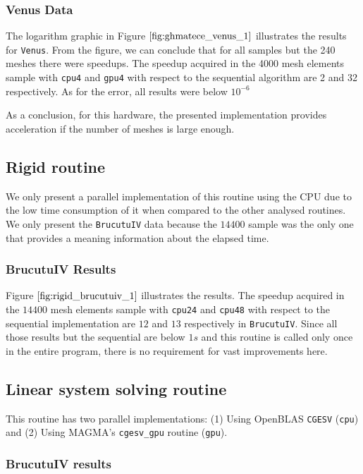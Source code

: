 \subsubsection{Venus Data}

The logarithm graphic in Figure $\ref{fig:ghmatece_venus_1}$ illustrates the results for \texttt{Venus}. 
From the figure, we can conclude that for all samples but the 240 meshes there were speedups. The speedup 
acquired in the 4000 mesh elements sample with \texttt{cpu4} and \texttt{gpu4} with respect to the sequential algorithm are 2 and 32 respectively.
As for the error, all results were below  $10^{-6}$

As a conclusion, for this hardware, the presented implementation provides acceleration if the number of meshes is large enough. 

\subsection{Rigid routine}

We only present a parallel implementation of this routine using the CPU due to the low time 
consumption of it when compared to the other analysed routines. We only present the \texttt{BrucutuIV} 
data because the $14400$ sample was the only one that provides a meaning information about the elapsed time.

\subsubsection{BrucutuIV Results}

Figure $\ref{fig:rigid_brucutuiv_1}$ illustrates the results. The speedup acquired in the $14400$ mesh elements 
sample with  \texttt{cpu24} and \texttt{cpu{48}} with respect to the sequential implementation are $12$ and $13$ 
respectively in \texttt{BrucutuIV}. 
Since all those results but the sequential are below $1s$ and this routine is called only once in the entire program, 
there is no requirement for vast improvements here.

\subsection{Linear system solving routine}

This routine has two parallel implementations: (1) Using OpenBLAS \texttt{CGESV} 
(\texttt{cpu}) and (2) Using MAGMA's \texttt{cgesv\_gpu} routine (\texttt{gpu}). 

\subsubsection{BrucutuIV results}

